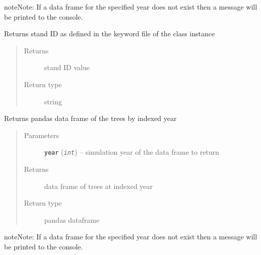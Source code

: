 \documentclass[letterpaper,10pt,english]{sphinxmanual}
\begin{document}
\begin{fulllineitems}
\begin{fulllineitems}
\begin{notice}{note}{Note:}
If a data frame for the specified year does not exist then
a message will be printed to the console.
\end{notice}

\end{fulllineitems}


\begin{fulllineitems}
\label{fuels_Fvsfuels:fuels.Fvsfuels.get_standid}
Returns stand ID as defined in the keyword file of the class instance
\begin{quote}\begin{description}
\item[{Returns}] \leavevmode
stand ID value

\item[{Return type}] \leavevmode
string

\end{description}\end{quote}

\end{fulllineitems}


\begin{fulllineitems}
\label{fuels_Fvsfuels:fuels.Fvsfuels.get_trees}
Returns pandas data frame of the trees by indexed year
\begin{quote}\begin{description}
\item[{Parameters}] \leavevmode
\textbf{\texttt{year}} (\emph{\texttt{int}}) -- simulation year of the data frame to return

\item[{Returns}] \leavevmode
data frame of trees at indexed year

\item[{Return type}] \leavevmode
pandas dataframe

\end{description}\end{quote}

\begin{notice}{note}{Note:}
If a data frame for the specified year does not exist then
a message will be printed to the console.
\end{notice}


\end{fulllineitems}
\end{fulllineitems}
\end{document}
